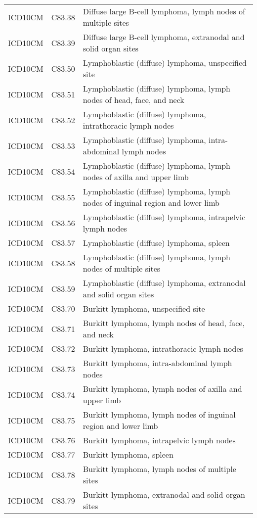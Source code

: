 \begin{longtable}{p{}p{}p{}}
  ICD10CM & C83.38 & Diffuse large B-cell lymphoma, lymph nodes of multiple sites \\ 
  ICD10CM & C83.39 & Diffuse large B-cell lymphoma, extranodal and solid organ sites \\ 
  ICD10CM & C83.50 & Lymphoblastic (diffuse) lymphoma, unspecified site \\ 
  ICD10CM & C83.51 & Lymphoblastic (diffuse) lymphoma, lymph nodes of head, face, and neck \\ 
  ICD10CM & C83.52 & Lymphoblastic (diffuse) lymphoma, intrathoracic lymph nodes \\ 
  ICD10CM & C83.53 & Lymphoblastic (diffuse) lymphoma, intra-abdominal lymph nodes \\ 
  ICD10CM & C83.54 & Lymphoblastic (diffuse) lymphoma, lymph nodes of axilla and upper limb \\ 
  ICD10CM & C83.55 & Lymphoblastic (diffuse) lymphoma, lymph nodes of inguinal region and lower limb \\ 
  ICD10CM & C83.56 & Lymphoblastic (diffuse) lymphoma, intrapelvic lymph nodes \\ 
  ICD10CM & C83.57 & Lymphoblastic (diffuse) lymphoma, spleen \\ 
  ICD10CM & C83.58 & Lymphoblastic (diffuse) lymphoma, lymph nodes of multiple sites \\ 
  ICD10CM & C83.59 & Lymphoblastic (diffuse) lymphoma, extranodal and solid organ sites \\ 
  ICD10CM & C83.70 & Burkitt lymphoma, unspecified site \\ 
  ICD10CM & C83.71 & Burkitt lymphoma, lymph nodes of head, face, and neck \\ 
  ICD10CM & C83.72 & Burkitt lymphoma, intrathoracic lymph nodes \\ 
  ICD10CM & C83.73 & Burkitt lymphoma, intra-abdominal lymph nodes \\ 
  ICD10CM & C83.74 & Burkitt lymphoma, lymph nodes of axilla and upper limb \\ 
  ICD10CM & C83.75 & Burkitt lymphoma, lymph nodes of inguinal region and lower limb \\ 
  ICD10CM & C83.76 & Burkitt lymphoma, intrapelvic lymph nodes \\ 
  ICD10CM & C83.77 & Burkitt lymphoma, spleen \\ 
  ICD10CM & C83.78 & Burkitt lymphoma, lymph nodes of multiple sites \\ 
  ICD10CM & C83.79 & Burkitt lymphoma, extranodal and solid organ sites \\ 

\end{longtable}
